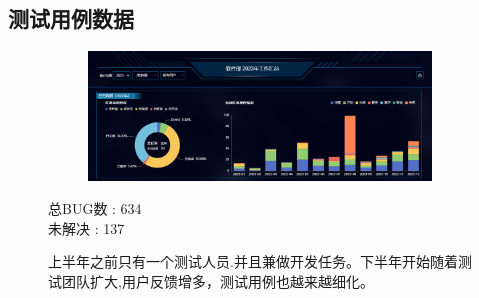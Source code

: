 \documentclass[AutoFakeBold,AutoFakeSlant]{beamer}
\begin{document}
	\subsection{测试用例数据}
	\begin{frame}[fragile]
		\begin{figure}
			\centering %
			\begin{subfigure}{\linewidth}
				\includegraphics[width=\linewidth]{Task}
			\end{subfigure}
			
			\begin{minipage}[l]{0.3\linewidth}
				\large
				总BUG数 : 634 \\
				未解决  : 137
			\end{minipage}\hfill
			\begin{minipage}[l]{0.6\linewidth}
			\footnotesize
			上半年之前只有一个测试人员.并且兼做开发任务。下半年开始随着测试团队扩大,用户反馈增多，测试用例也越来越细化。
			\end{minipage}
		\end{figure} 
	\end{frame}
	

	
\end{document}
